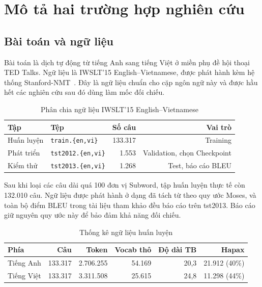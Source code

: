 \documentclass[11pt,a4paper]{article}
\newcommand{\file}[1]{\texttt{\small #1}}
\begin{document}
\section{Mô tả hai trường hợp nghiên cứu}
\label{sec:mota}

\subsection{Bài toán và ngữ liệu}

Bài toán là dịch tự động từ tiếng Anh sang tiếng Việt ở miền phụ đề hội thoại
TED Talks. Ngữ liệu là IWSLT'15 English--Vietnamese, được phát hành kèm hệ thống
Stanford-NMT~\cite{luong2015iwslt}. Đây là ngữ liệu chuẩn cho cặp ngôn ngữ này
và được hầu hết các nghiên cứu sau đó dùng làm mốc đối chiếu.

\begin{table}[H]
\centering
\caption{Phân chia ngữ liệu IWSLT'15 English--Vietnamese}
\label{tab:data}
\begin{tabular}{llrr}
\toprule
\textbf{Tập} & \textbf{Tệp} & \textbf{Số câu} & \textbf{Vai trò} \\
\midrule
Huấn luyện & \file{train.\{en,vi\}}   & 133.317 & Training \\
Phát triển & \file{tst2012.\{en,vi\}} & 1.553   & Validation, chọn Checkpoint \\
Kiểm thử   & \file{tst2013.\{en,vi\}} & 1.268   & Test, báo cáo BLEU \\
\bottomrule
\end{tabular}
\end{table}

Sau khi loại các câu dài quá 100 đơn vị Subword, tập huấn luyện thực tế còn
132.010 câu. Ngữ liệu được phát hành ở dạng đã tách từ theo quy ước Moses, và
toàn bộ điểm BLEU trong tài liệu tham khảo đều báo cáo trên tst2013. Báo cáo giữ
nguyên quy ước này để bảo đảm khả năng đối chiếu.

\begin{table}[H]
\centering
\caption{Thống kê ngữ liệu huấn luyện}
\label{tab:stats}
\begin{tabular}{lrrrrr}
\toprule
\textbf{Phía} & \textbf{Câu} & \textbf{Token} & \textbf{Vocab thô}
& \textbf{Độ dài TB} & \textbf{Hapax} \\
\midrule
Tiếng Anh  & 133.317 & 2.706.255 & 54.169 & 20,3 & 21.912 \small(40\%) \\
Tiếng Việt & 133.317 & 3.311.508 & 25.615 & 24,8 & 11.298 \small(44\%) \\
\bottomrule
\end{tabular}
\end{table}
\end{document}
